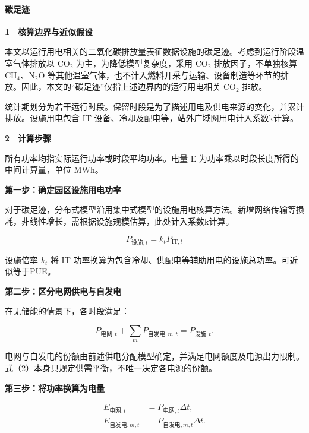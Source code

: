 \paragraph{碳足迹}

\textbf{1　核算边界与近似假设}

本文以运行用电相关的二氧化碳排放量表征数据设施的碳足迹。考虑到运行阶段温室气体排放以 CO$_2$ 为主，为降低模型复杂度，采用 CO$_2$ 排放因子，不单独核算 CH$_4$、N$_2$O 等其他温室气体，也不计入燃料开采与运输、设备制造等环节的排放。因此，本文的“碳足迹”仅指上述边界内的运行用电相关 CO$_2$ 排放。

统计期划分为若干运行时段。保留时段是为了描述用电及供电来源的变化，并累计排放。设施用电包含 IT 设备、冷却及配电等，站外广域网用电计入系数k计算。

\textbf{2　计算步骤}

所有功率均指实际运行功率或时段平均功率。电量 E 为功率乘以时段长度所得的中间计算量，单位 MWh。

\textbf{第一步：确定园区设施用电功率}

对于碳足迹，分布式模型沿用集中式模型的设施用电核算方法。新增网络传输等损耗，非线性增长，需根据设施规模估算，此处计入系数k计算。

\begin{equation}
P_{\text{设施},t}=k_tP_{\mathrm{IT},t}
\tag{1}
\end{equation}

设施倍率 $k_t$ 将 IT 功率换算为包含冷却、供配电等辅助用电的设施总功率。可近似等于PUE。

\textbf{第二步：区分电网供电与自发电}

在无储能的情景下，各时段满足：

\begin{equation}
P_{\text{电网},t}
+\sum_mP_{\text{自发电},m,t}
=P_{\text{设施},t}.
\tag{2}
\end{equation}

电网与自发电的份额由前述供电分配模型确定，并满足电网额度及电源出力限制。式（2）本身只规定供需平衡，不唯一决定各电源的份额。

\textbf{第三步：将功率换算为电量}

\begin{equation}
\begin{aligned}
E_{\text{电网},t} &= P_{\text{电网},t}\Delta t,\\
E_{\text{自发电},m,t} &= P_{\text{自发电},m,t}\Delta t.
\end{aligned}
\tag{3}
\end{equation}

